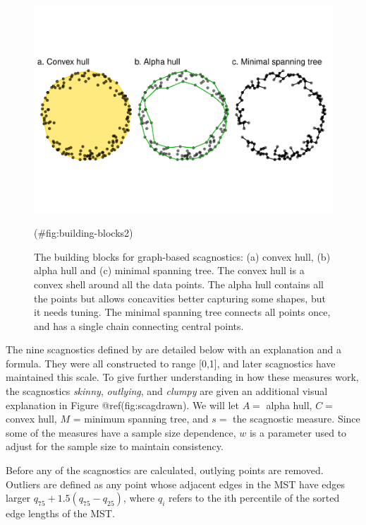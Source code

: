 \begin{Schunk}
\begin{figure}
\includegraphics[width=1\linewidth]{mason-lee-laa-cook_files/figure-latex/building-blocks2-1} \caption[The building blocks for graph-based scagnostics]{The building blocks for graph-based scagnostics: (a) convex hull, (b) alpha hull and (c) minimal spanning tree. The convex hull is a convex shell around all the data points. The alpha hull contains all the points but allows concavities better capturing some shapes, but it needs tuning. The minimal spanning tree connects all points once, and has a single chain connecting central points.}(\#fig:building-blocks2)
\end{figure}
\end{Schunk}

The nine scagnostics defined by \citet{scagdist} are detailed below with
an explanation and a formula. They were all constructed to range
{[}0,1{]}, and later scagnostics have maintained this scale. To give
further understanding in how these measures work, the scagnostics
\emph{skinny}, \emph{outlying}, and \emph{clumpy} are given an
additional visual explanation in Figure @ref(fig:scagdrawn). We will let
\(A=\) alpha hull, \(C=\) convex hull, \(M\) = minimum spanning tree,
and \(s=\) the scagnostic measure. Since some of the measures have a
sample size dependence, \(w\) is a parameter used to adjust for the
sample size to maintain consistency.

Before any of the scagnostics are calculated, outlying points are
removed. Outliers are defined as any point whose adjacent edges in the
MST have edges larger \(q_{75} + 1.5(q_{75} - q_{25})\), where \(q_i\)
refers to the ith percentile of the sorted edge lengths of the MST.

